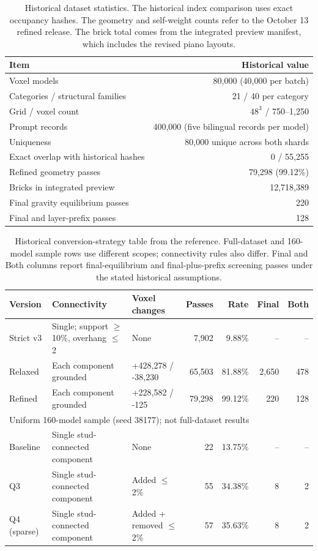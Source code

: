 \begin{table}[!htbp]\centering\small
\begin{tabular}{lr}\toprule
Item & Historical value \\ \midrule
Voxel models & 80,000 (40,000 per batch) \\
Categories / structural families & 21 / 40 per category \\
Grid / voxel count & $48^3$ / 750--1,250 \\
Prompt records & 400,000 (five bilingual records per model) \\
Uniqueness & 80,000 unique across both shards \\
Exact overlap with historical hashes & 0 / 55,255 \\
Refined geometry passes & 79,298 (99.12\%) \\
Bricks in integrated preview & 12,718,389 \\
Final gravity equilibrium passes & 220 \\
Final and layer-prefix passes & 128 \\
\bottomrule\end{tabular}
\caption{Historical dataset statistics. The historical index comparison uses exact occupancy hashes. The geometry and self-weight counts refer to the October 13 refined release. The brick total comes from the integrated preview manifest, which includes the revised piano layouts.}
\end{table}

\begin{table}[!htbp]\centering\small
\setlength{\tabcolsep}{3pt}
\begin{tabular}{@{}l>{\raggedright\arraybackslash}p{3.9cm}>{\raggedright\arraybackslash}p{2.5cm}rrrr@{}}\toprule
Version & Connectivity & Voxel changes & Passes & Rate & Final & Both \\ \midrule
Strict v3 & Single; support $\geq$10\%, overhang $\leq$2 & None & 7,902 & 9.88\% & -- & -- \\
Relaxed & Each component grounded & +428,278 / -38,230 & 65,503 & 81.88\% & 2,650 & 478 \\
Refined & Each component grounded & +228,582 / -125 & 79,298 & 99.12\% & 220 & 128 \\
\midrule
\multicolumn{7}{l}{Uniform 160-model sample (seed 38177); not full-dataset results} \\
Baseline & Single stud-connected component & None & 22 & 13.75\% & -- & -- \\
Q3 & Single stud-connected component & Added $\leq$2\% & 55 & 34.38\% & 8 & 2 \\
Q4 (sparse) & Single stud-connected component & Added + removed $\leq$2\% & 57 & 35.63\% & 8 & 2 \\
\bottomrule\end{tabular}
\caption{Historical conversion-strategy table from the reference. Full-dataset and 160-model sample rows use different scopes; connectivity rules also differ. Final and Both columns report final-equilibrium and final-plus-prefix screening passes under the stated historical assumptions.}
\end{table}

